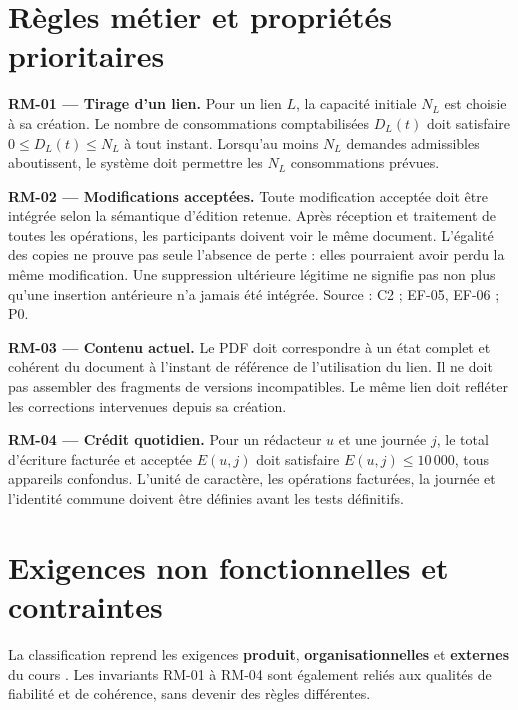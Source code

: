 \section{Règles métier et propriétés prioritaires}
\textbf{RM-01 --- Tirage d'un lien.} Pour un lien $L$, la capacité initiale $N_L$ est choisie à sa création. Le nombre de consommations comptabilisées $D_L(t)$ doit satisfaire $0 \leq D_L(t) \leq N_L$ à tout instant. Lorsqu'au moins $N_L$ demandes admissibles aboutissent, le système doit permettre les $N_L$ consommations prévues.

\textbf{RM-02 --- Modifications acceptées.} Toute modification acceptée doit être intégrée selon la sémantique d'édition retenue. Après réception et traitement de toutes les opérations, les participants doivent voir le même document. L'égalité des copies ne prouve pas seule l'absence de perte : elles pourraient avoir perdu la même modification. Une suppression ultérieure légitime ne signifie pas non plus qu'une insertion antérieure n'a jamais été intégrée. Source : C2 ; EF-05, EF-06 ; P0.

\textbf{RM-03 --- Contenu actuel.} Le PDF doit correspondre à un état complet et cohérent du document à l'instant de référence de l'utilisation du lien. Il ne doit pas assembler des fragments de versions incompatibles. Le même lien doit refléter les corrections intervenues depuis sa création. 

\textbf{RM-04 --- Crédit quotidien.} Pour un rédacteur $u$ et une journée $j$, le total d'écriture facturée et acceptée $E(u,j)$ doit satisfaire $E(u,j) \leq 10\,000$, tous appareils confondus. L'unité de caractère, les opérations facturées, la journée et l'identité commune doivent être définies avant les tests définitifs.

\section{Exigences non fonctionnelles et contraintes}
La classification reprend les exigences \textbf{produit}, \textbf{organisationnelles} et \textbf{externes} du cours \cite[diapositives 9--14]{cours}. Les invariants RM-01 à RM-04 sont également reliés aux qualités de fiabilité et de cohérence, sans devenir des règles différentes.
